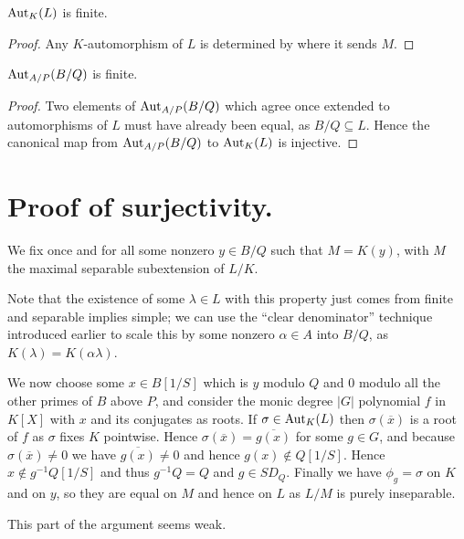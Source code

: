 \begin{corollary} $\operatorname{Aut}_K(L)$ is finite.
\end{corollary}
\begin{proof} Any $K$-automorphism of $L$ is determined by where it sends $M$.
\end{proof}

\begin{corollary} $\operatorname{Aut}_{A/P}(B/Q)$ is finite.
\end{corollary}
\begin{proof}
  Two elements of $\operatorname{Aut}_{A/P}(B/Q)$ which agree once extended to automorphisms of $L$
  must have already been equal, as $B/Q\subseteq L$. Hence the canonical map
  from $\operatorname{Aut}_{A/P}(B/Q)$ to $\operatorname{Aut}_K(L)$ is injective.
\end{proof}

\section{Proof of surjectivity.}

\begin{definition} We fix once and for all some nonzero $y\in B/Q$ such that $M=K(y)$,
  with $M$ the maximal separable subextension of $L/K$.
\end{definition}

Note that the existence of some $\lambda\in L$ with this property just comes from finite
and separable implies simple; we can use the ``clear denominator'' technique introduced
earlier to scale this by some nonzero $\alpha\in A$ into $B/Q$, as
$K(\lambda)=K(\alpha\lambda)$.

We now choose some $x\in B[1/S]$ which is $y$ modulo $Q$ and $0$ modulo all the other
primes of $B$ above $P$, and consider the monic degree $|G|$ polynomial $f$ in $K[X]$
with $x$ and its conjugates as roots. If $\sigma\in\operatorname{Aut}_K(L)$ then $\sigma(\overline{x})$
is a root of $f$ as $\sigma$ fixes $K$ pointwise. Hence $\sigma(\overline{x})=\overline{g(x)}$
for some $g\in G$, and because $\sigma(\overline{x})\not=0$ we have $\overline{g(x)}\not=0$
and hence $g(x)\notin Q[1/S]$. Hence $x\notin g^{-1} Q[1/S]$ and thus $g^{-1}Q=Q$ and $g\in SD_Q$.
Finally we have $\phi_g=\sigma$ on $K$ and on $y$, so they are equal on $M$ and hence on $L$ as
$L/M$ is purely inseparable.

This part of the argument seems weak.
